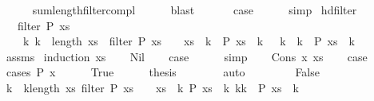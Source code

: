 \begin{isabellebody}
\ \ \ \ \isamarkupfalse%
\ sum{\isacharunderscore}length{\isacharunderscore}filter{\isacharunderscore}compl\isanewline
\ \ \ \ \isamarkupfalse%
\ blast\isanewline
\isanewline
\ \ \isamarkupfalse%
\isanewline
\isanewline
\ \ \isamarkupfalse%
\ {\isacharquery}case\isanewline
\ \ \ \ \isamarkupfalse%
\ simp\isanewline
{}\isamarkupfalse%
%
\endisatagproof
{\isafoldproof}%
%
\isadelimproof
\isanewline
%
\endisadelimproof
\isanewline
\isanewline
{}\isamarkupfalse%
\ hd{\isacharunderscore}filter{\isacharcolon}\isanewline
\ \ \ {\isachardoublequoteopen}filter\ P\ xs\ {\isasymnoteq}\ {\isacharbrackleft}{\isacharbrackright}{\isachardoublequoteclose}\isanewline
\ \ \ {\isachardoublequoteopen}{\isasymexists}\ k{\isachardot}\ k\ {\isacharless}\ length\ xs\ {\isasymand}\ {\isacharparenleft}filter\ P\ xs{\isacharparenright}\ {\isacharbang}\ {}\ {\isacharequal}\ xs\ {\isacharbang}\ k\ {\isasymand}\ P\ {\isacharparenleft}xs\ {\isacharbang}\ k{\isacharparenright}\ {\isasymand}\ {\isacharparenleft}{\isasymforall}\ k{\isacharprime}\ {\isacharless}\ k{\isachardot}\ {\isasymnot}\ P\ {\isacharparenleft}xs\ {\isacharbang}\ k{\isacharprime}{\isacharparenright}{\isacharparenright}{\isachardoublequoteclose}\isanewline
%
\isadelimproof
\ \ %
\endisadelimproof
%
\isatagproof
{}\isamarkupfalse%
\ assms\isanewline
{}\isamarkupfalse%
\ {\isacharparenleft}induction\ xs{\isacharparenright}\isanewline
\ \ \isamarkupfalse%
\ Nil\isanewline
\ \ \isamarkupfalse%
\ {\isacharquery}case\isanewline
\ \ \ \ \isamarkupfalse%
\ simp\isanewline
{}\isamarkupfalse%
\isanewline
\ \ \isamarkupfalse%
\ {\isacharparenleft}Cons\ x\ xs{\isacharparenright}\isanewline
\ \ \isamarkupfalse%
\ {\isacharquery}case\isanewline
\ \ \isamarkupfalse%
\ {\isacharparenleft}cases\ {\isachardoublequoteopen}P\ x{\isachardoublequoteclose}{\isacharparenright}\isanewline
\ \ \ \ \isamarkupfalse%
\ True\isanewline
\ \ \ \ \isamarkupfalse%
\ {\isacharquery}thesis\isanewline
\ \ \ \ \ \ \isamarkupfalse%
\ auto\isanewline
\ \ \isamarkupfalse%
\isanewline
\ \ \ \ \isamarkupfalse%
\ False\isanewline
\ \ \ \ \isamarkupfalse%
\ \isamarkupfalse%
\ k\ \ {\isachardoublequoteopen}k{\isacharless}length\ xs{\isachardoublequoteclose}\ {\isachardoublequoteopen}filter\ P\ xs\ {\isacharbang}\ {}\ {\isacharequal}\ xs\ {\isacharbang}\ k{\isachardoublequoteclose}\ {\isachardoublequoteopen}P\ {\isacharparenleft}xs\ {\isacharbang}\ k{\isacharparenright}{\isachardoublequoteclose}\ {\isachardoublequoteopen}{\isacharparenleft}{\isasymforall}k{\isacharprime}{\isacharless}k{\isachardot}\ {\isasymnot}\ P\ {\isacharparenleft}xs\ {\isacharbang}\ k{\isacharprime}{\isacharparenright}{\isacharparenright}{\isachardoublequoteclose}\isanewline

\end{isabellebody}
